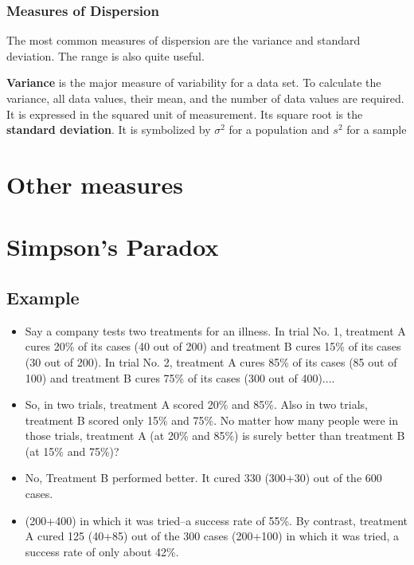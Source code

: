 \begin{frame}
\frametitle{Measures of Dispersion}

The most common measures of dispersion are the variance and standard deviation. The range is also quite useful.

\textbf{Variance} is the major measure of variability for a data set. To calculate the variance, all data values, their mean, and the number of data values are required. It is expressed in the squared unit of measurement. Its square root is the \textbf{standard deviation}. It is symbolized by $\sigma^2$ for a population and $s^2$ for a sample


\newpage
\section{Other measures}
\section{Simpson's Paradox}

\subsection{Example}
\begin{itemize}
\item Say a company tests two treatments for an illness. In trial No. 1, treatment A cures 20\% of its cases (40 out of 200) and treatment B cures 15\% of its cases (30 out of 200). In trial No. 2, treatment A cures 85\% of its cases (85 out of 100) and treatment B cures 75\% of its cases (300 out of 400)....
\item
So, in two trials, treatment A scored 20\% and 85\%. Also in two trials, treatment B scored only 15\% and 75\%. No matter how many people were in those trials, treatment A (at 20\% and 85\%) is surely better than treatment B (at 15\% and 75\%)?
\item
No, Treatment B performed better. It cured 330 (300+30) out of the 600 cases.
\item
(200+400) in which it was tried--a success rate of 55\%. By contrast, treatment A cured 125 (40+85) out of the 300 cases (200+100) in which it was tried, a success rate of only about 42\%.
\end{itemize}


\end{frame}
